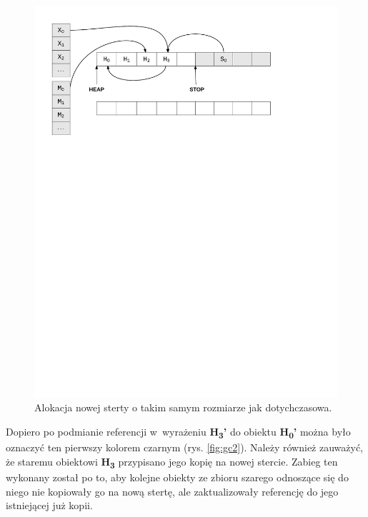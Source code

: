 \begin{figure}[h]
\centerline{\includegraphics[scale=0.75, clip, trim=10mm 185mm 45mm 10mm]{gc_1}}
\caption{Alokacja nowej sterty o takim samym rozmiarze jak dotychczasowa.}
\label{fig:gc1}
\end{figure}

Dopiero po podmianie referencji w~wyrażeniu \textbf{H\textsubscript{3}'} do obiektu \textbf{H\textsubscript{0}'} można było oznaczyć ten pierwszy kolorem czarnym (rys. \ref{fig:gc2}).
Należy również zauważyć, że staremu obiektowi \textbf{H\textsubscript{3}} przypisano jego kopię na nowej stercie.
Zabieg ten wykonany został po to, aby kolejne obiekty ze zbioru szarego odnoszące się do niego nie kopiowały go na nową stertę, ale zaktualizowały referencję do jego istniejącej już kopii.

